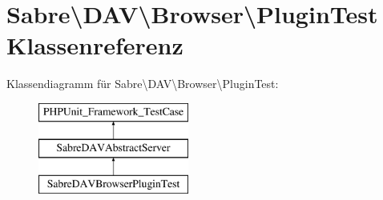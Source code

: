 \hypertarget{class_sabre_1_1_d_a_v_1_1_browser_1_1_plugin_test}{}\section{Sabre\textbackslash{}D\+AV\textbackslash{}Browser\textbackslash{}Plugin\+Test Klassenreferenz}
\label{class_sabre_1_1_d_a_v_1_1_browser_1_1_plugin_test}
Klassendiagramm für Sabre\textbackslash{}D\+AV\textbackslash{}Browser\textbackslash{}Plugin\+Test\+:\begin{figure}[H]
\begin{center}
\leavevmode
\includegraphics[height=3.000000cm]{class_sabre_1_1_d_a_v_1_1_browser_1_1_plugin_test}
\end{center}
\end{figure}
